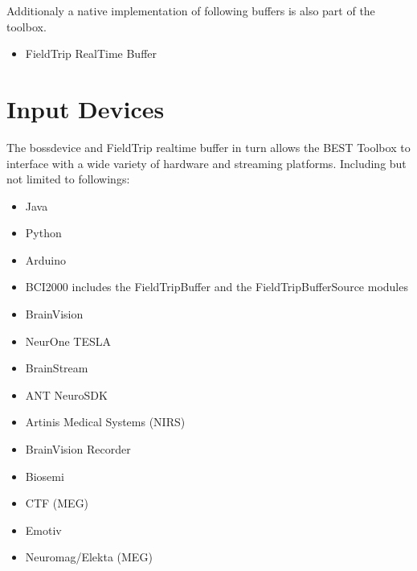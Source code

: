 \documentclass[letterpaper,10pt,english]{sphinxmanual}
\begin{document}
\sphinxAtStartPar
Additionaly a native implementation of following buffers is also part of the toolbox.
\begin{itemize}
\item {} 
\sphinxAtStartPar
FieldTrip Real\sphinxhyphen{}Time Buffer

\end{itemize}


\section{Input Devices}
\label{\detokenize{index:input-devices}}
\sphinxAtStartPar
The bossdevice and FieldTrip real\sphinxhyphen{}time buffer in turn allows the BEST Toolbox to interface with a wide variety of hardware and streaming platforms. Including but not limited to followings:
\begin{itemize}
\item {} 
\sphinxAtStartPar
Java

\item {} 
\sphinxAtStartPar
Python

\item {} 
\sphinxAtStartPar
Arduino

\item {} 
\sphinxAtStartPar
BCI2000 includes the FieldTripBuffer and the FieldTripBufferSource modules

\item {} 
\sphinxAtStartPar
BrainVision

\item {} 
\sphinxAtStartPar
NeurOne TESLA

\item {} 
\sphinxAtStartPar
BrainStream

\item {} 
\sphinxAtStartPar
ANT NeuroSDK

\item {} 
\sphinxAtStartPar
Artinis Medical Systems (NIRS)

\item {} 
\sphinxAtStartPar
BrainVision Recorder

\item {} 
\sphinxAtStartPar
Biosemi

\item {} 
\sphinxAtStartPar
CTF (MEG)

\item {} 
\sphinxAtStartPar
Emotiv

\item {} 
\sphinxAtStartPar
Neuromag/Elekta (MEG)


\end{itemize}
\end{document}

